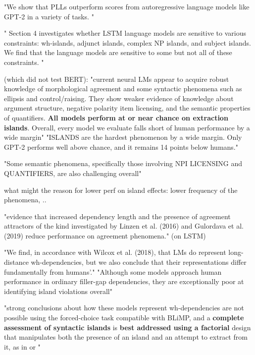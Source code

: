 "We show that PLLs outperform scores from autoregressive language models like GPT-2 in a variety of tasks. " \citep{salazar2020masked}

" Section 4 investigates whether
LSTM language models are sensitive to various
constraints: wh-islands, adjunct islands, complex
NP islands, and subject islands. We find that the
language models are sensitive to some but not all
of these constraints. " \citep{wilcox2018rnn}

\citet{warstadt2020blimp} (which did not test BERT): "current neural LMs appear to acquire robust
knowledge of morphological agreement and some syntactic phenomena such as ellipsis and control/raising. They show weaker evidence of knowledge about argument structure, negative polarity item licensing, and the semantic properties of quantifiers. \textbf{All models perform at or near chance on extraction islands}. Overall, every model we evaluate falls short of human performance by a wide margin"
"ISLANDS are the hardest phenomenon by a wide margin. Only GPT-2 performs well above
chance, and it remains 14 points below humans." \citet{warstadt2020blimp}

"Some semantic phenomena, specifically those involving NPI LICENSING and QUANTIFIERS, are also challenging overall"

what might the reason for lower perf on island effects: lower frequency of the phenomena, ..

"evidence that increased dependency length and the presence of agreement attractors of the kind investigated by Linzen et al. (2016) and Gulordava et al. (2019) reduce performance on agreement phenomena." (on LSTM) \citet{warstadt2020blimp}

"We find, in accordance with Wilcox et al.
(2018), that LMs do represent long-distance
wh-dependencies, but we also conclude that
their representations differ fundamentally from humans’." \citet{warstadt2020blimp}
"Although some models approach human
performance in ordinary filler-gap dependencies,
they are exceptionally poor at identifying island
violations overall" \citet{warstadt2020blimp}

"strong conclusions about how these models represent wh-dependencies are not possible using the forced-choice task compatible with BLiMP, and
a \textbf{complete assessment of syntactic islands} is \textbf{best
	addressed using a factorial} design that manipulates
both the presence of an island and an attempt to
extract from it, as in \citet{kush2018investigating} or  \citet{wilcox2018rnn}" \citep{warstadt2020blimp}

